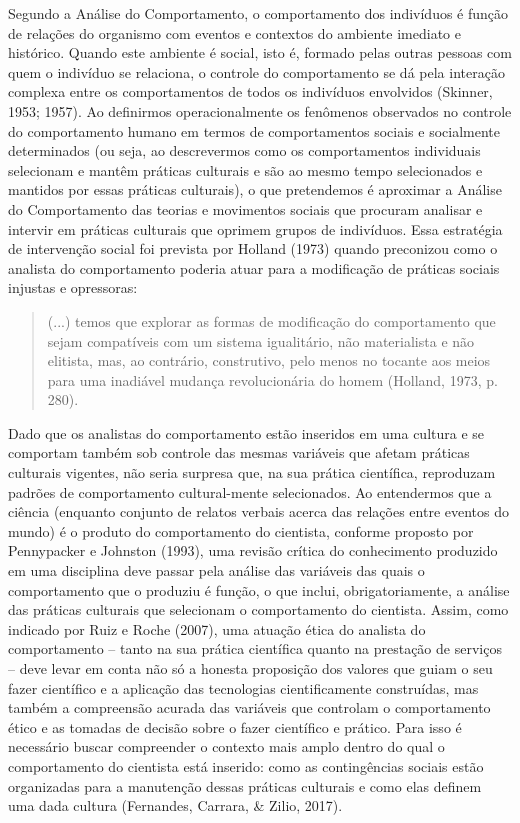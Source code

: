 Segundo a Análise do Comportamento, o comportamento dos indivíduos é função de relações do organismo com eventos e contextos do ambiente imediato e histórico. Quando este ambiente é social, isto é, formado pelas outras pessoas com quem o indivíduo se relaciona, o controle do comportamento se dá pela interação complexa entre os comportamentos de todos os indivíduos envolvidos (Skinner, 1953; 1957). Ao definirmos operacionalmente os fenômenos observados no controle do comportamento humano em termos de comportamentos sociais e socialmente determinados (ou seja, ao descrevermos como os comportamentos individuais selecionam e mantêm práticas culturais e são ao mesmo tempo selecionados e mantidos por essas práticas culturais), o que pretendemos é aproximar a Análise do Comportamento das teorias e movimentos sociais que procuram analisar e intervir em práticas culturais que oprimem grupos de indivíduos. Essa estratégia de intervenção social foi prevista por Holland (1973) quando preconizou como o analista do comportamento poderia atuar para a modificação de práticas sociais injustas e opressoras:

\begin{quote}
    (...) temos que explorar as formas de modificação do comportamento que sejam compatíveis com um sistema igualitário, não materialista e não elitista, mas, ao contrário, construtivo, pelo menos no tocante aos meios para uma inadiável mudança revolucionária do homem (Holland, 1973, p. 280).
\end{quote}

Dado que os analistas do comportamento estão inseridos em uma cultura e se comportam também sob controle das mesmas variáveis que afetam práticas culturais vigentes, não seria surpresa que, na sua prática científica, reproduzam padrões de comportamento cultural-\linebreak mente selecionados. Ao entendermos que a ciência (enquanto conjunto de relatos verbais acerca das relações entre eventos do mundo) é o produto do comportamento do cientista, conforme proposto por Pennypacker e Johnston (1993), uma revisão crítica do conhecimento produzido em uma disciplina deve passar pela análise das variáveis das quais o comportamento que o produziu é função, o que inclui, obrigatoriamente, a análise das práticas culturais que selecionam o comportamento do cientista. Assim, como indicado por Ruiz e Roche (2007), uma atuação ética do analista do comportamento – tanto na sua prática científica quanto na prestação de serviços – deve levar em conta não só a honesta proposição dos valores que guiam o seu fazer científico e a aplicação das tecnologias cientificamente construídas, mas também a compreensão acurada das variáveis que controlam o comportamento ético e as tomadas de decisão sobre o fazer científico e prático. Para isso é necessário buscar compreender o contexto mais amplo dentro do qual o comportamento do cientista está inserido: como as contingências sociais estão organizadas para a manutenção dessas práticas culturais e como elas definem uma dada cultura (Fernandes, Carrara, \& Zilio, 2017).

